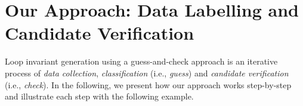 \section{Our Approach: Data Labelling and Candidate Verification}
\label{sec:overview}
Loop invariant generation using a guess-and-check approach is an iterative process of \emph{data collection}, \emph{classification} (i.e., \emph{guess}) and \emph{candidate verification} (i.e., \emph{check}).
In the following, we present how our approach works step-by-step and illustrate each step with the following example.


